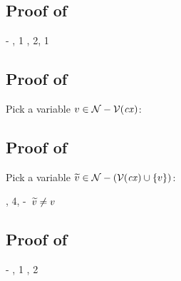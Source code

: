 \subsection*{Proof of }

\begin{derivation}
\step{\hastyO{\expr}{\bool}}
     {\hyp}
\step{\cxwfO}
     {, 1}
\step{\cxwf{\snoc{\cx}{\axM{\expr}}}}
     {\Rcxax, 2, 1}
\end{derivation}



\subsection*{Proof of }

\begin{derivation}
\end{derivation}
Pick a variable $v\in\mathcal{N}-\mathcal{V}(\mathit{cx})$:
\begin{derivatioN}{1}
\end{derivatioN}



\subsection*{Proof of }

Pick a variable $\widetilde{v}\in\mathcal{N}-(\mathcal{V}(\mathit{cx})\cup\{v\})$:
\begin{derivation}
\step{\istyO{\typ}}{\hyp}
\step{\hastyO{\abs{\var}{\typ}{\var}}{\tarr{\typ}{\typ}}}
     {\Reabsalpha, 4, \hyp\ $\widetilde{v}\neq v$}
\end{derivation}



\subsection*{Proof of }

\begin{derivation}
\step{\cxwfO}
     {\hyp}
\step{\istyO{\bool}}
     {\Rtbool, 1}
\step{\hastyO{\abs{\var}{\bool}{\var}}{\tarr{\bool}{\bool}}}
     {\Reid, 2}
\end{derivation}



